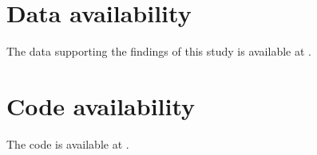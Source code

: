 \section{Data availability}

The data supporting the findings of this study is available at \url{}.

\section{Code availability}

The code is available at \url{}.
